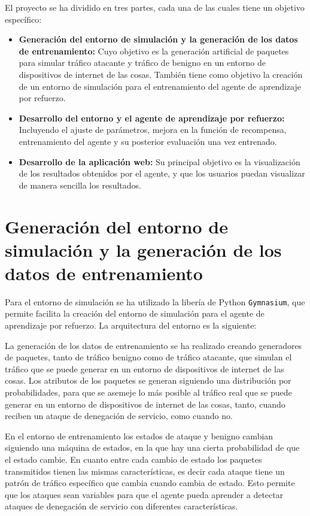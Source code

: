 
El proyecto se ha dividido en tres partes, cada una de las cuales tiene un objetivo específico:
\begin{itemize}
    \item \textbf{Generación del entorno de simulación y la generación de los datos de entrenamiento:} Cuyo objetivo es la generación artificial de paquetes para simular tráfico atacante y tráfico de benigno en un entorno de dispositivos de internet de las cosas. También tiene como objetivo la creación de un entorno de simulación para el entrenamiento del agente de aprendizaje por refuerzo.
    \item \textbf{Desarrollo del entorno y el agente de aprendizaje por refuerzo:} Incluyendo el ajuste de parámetros, mejora en la función de recompensa, entrenamiento del agente y su posterior evaluación una vez entrenado.
    \item \textbf{Desarrollo de la aplicación web:} Su principal objetivo es la visualización de los resultados obtenidos por el agente, y que los usuarios puedan visualizar de manera sencilla los resultados.
\end{itemize}

\section{Generación del entorno de simulación y la generación de los datos de entrenamiento}
Para el entorno de simulación se ha utilizado la libería de Python \texttt{Gymnasium}, que permite facilita la creación del entorno de simulación para el agente de aprendizaje por refuerzo.
La arquitectura del entorno es la siguiente:

La generación de los datos de entrenamiento se ha realizado creando generadores de paquetes, tanto de tráfico benigno como de tráfico atacante, que simulan el tráfico que se puede generar en un entorno de dispositivos de internet de las cosas. Los atributos de los paquetes se generan siguiendo una distribución por probabilidades, para que se asemeje lo más posible al tráfico real que se puede generar en un entorno de dispositivos de internet de las cosas, tanto, cuando reciben un ataque de denegación de servicio, como cuando no.

En el entorno de entrenamiento los estados de ataque y benigno cambian siguiendo una máquina de estados, en la que hay una cierta probabilidad de que el estado cambie. En cuanto entre cada cambio de estado los paquetes transmitidos tienen las mismas características, es decir cada ataque tiene un patrón de tráfico específico que cambia cuando cambia de estado. Esto permite que los ataques sean variables para que el agente pueda aprender a detectar ataques de denegación de servicio con diferentes características.


